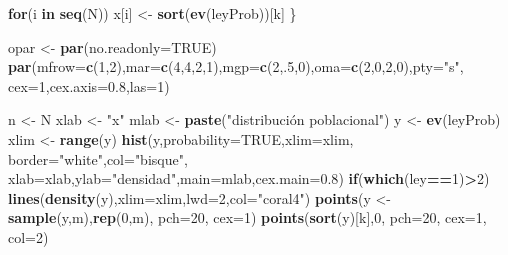 \documentclass[]{book}
\newenvironment{Shaded}{\begin{snugshade}}{\end{snugshade}}
\newcommand{\ControlFlowTok}[1]{\textcolor[rgb]{0.13,0.29,0.53}{\textbf{#1}}}
\newcommand{\DataTypeTok}[1]{\textcolor[rgb]{0.13,0.29,0.53}{#1}}
\newcommand{\DecValTok}[1]{\textcolor[rgb]{0.00,0.00,0.81}{#1}}
\newcommand{\FloatTok}[1]{\textcolor[rgb]{0.00,0.00,0.81}{#1}}
\newcommand{\KeywordTok}[1]{\textcolor[rgb]{0.13,0.29,0.53}{\textbf{#1}}}
\newcommand{\NormalTok}[1]{#1}
\newcommand{\OperatorTok}[1]{\textcolor[rgb]{0.81,0.36,0.00}{\textbf{#1}}}
\newcommand{\OtherTok}[1]{\textcolor[rgb]{0.56,0.35,0.01}{#1}}
\newcommand{\StringTok}[1]{\textcolor[rgb]{0.31,0.60,0.02}{#1}}
\begin{document}
\begin{Shaded}
\begin{Highlighting}[]
\ControlFlowTok{for}\NormalTok{(i }\ControlFlowTok{in} \KeywordTok{seq}\NormalTok{(N)) x[i] <-}\StringTok{ }\KeywordTok{sort}\NormalTok{(}\KeywordTok{ev}\NormalTok{(leyProb))[k]}
\NormalTok{\}}

\NormalTok{opar <-}\StringTok{ }\KeywordTok{par}\NormalTok{(}\DataTypeTok{no.readonly=}\OtherTok{TRUE}\NormalTok{)}
\KeywordTok{par}\NormalTok{(}\DataTypeTok{mfrow=}\KeywordTok{c}\NormalTok{(}\DecValTok{1}\NormalTok{,}\DecValTok{2}\NormalTok{),}\DataTypeTok{mar=}\KeywordTok{c}\NormalTok{(}\DecValTok{4}\NormalTok{,}\DecValTok{4}\NormalTok{,}\DecValTok{2}\NormalTok{,}\DecValTok{1}\NormalTok{),}\DataTypeTok{mgp=}\KeywordTok{c}\NormalTok{(}\DecValTok{2}\NormalTok{,.}\DecValTok{5}\NormalTok{,}\DecValTok{0}\NormalTok{),}\DataTypeTok{oma=}\KeywordTok{c}\NormalTok{(}\DecValTok{2}\NormalTok{,}\DecValTok{0}\NormalTok{,}\DecValTok{2}\NormalTok{,}\DecValTok{0}\NormalTok{),}\DataTypeTok{pty=}\StringTok{"s"}\NormalTok{,}
    \DataTypeTok{cex=}\DecValTok{1}\NormalTok{,}\DataTypeTok{cex.axis=}\FloatTok{0.8}\NormalTok{,}\DataTypeTok{las=}\DecValTok{1}\NormalTok{)}

\NormalTok{n <-}\StringTok{ }\NormalTok{N}
\NormalTok{xlab <-}\StringTok{ "x"}
\NormalTok{mlab <-}\StringTok{ }\KeywordTok{paste}\NormalTok{(}\StringTok{"distribución poblacional"}\NormalTok{)}
\NormalTok{y <-}\StringTok{ }\KeywordTok{ev}\NormalTok{(leyProb)}
\NormalTok{xlim <-}\StringTok{ }\KeywordTok{range}\NormalTok{(y)}
\KeywordTok{hist}\NormalTok{(y,}\DataTypeTok{probability=}\OtherTok{TRUE}\NormalTok{,}\DataTypeTok{xlim=}\NormalTok{xlim,}
    \DataTypeTok{border=}\StringTok{"white"}\NormalTok{,}\DataTypeTok{col=}\StringTok{"bisque"}\NormalTok{,}
    \DataTypeTok{xlab=}\NormalTok{xlab,}\DataTypeTok{ylab=}\StringTok{"densidad"}\NormalTok{,}\DataTypeTok{main=}\NormalTok{mlab,}\DataTypeTok{cex.main=}\FloatTok{0.8}\NormalTok{)}
\ControlFlowTok{if}\NormalTok{(}\KeywordTok{which}\NormalTok{(ley}\OperatorTok{==}\DecValTok{1}\NormalTok{)}\OperatorTok{>}\DecValTok{2}\NormalTok{) }\KeywordTok{lines}\NormalTok{(}\KeywordTok{density}\NormalTok{(y),}\DataTypeTok{xlim=}\NormalTok{xlim,}\DataTypeTok{lwd=}\DecValTok{2}\NormalTok{,}\DataTypeTok{col=}\StringTok{"coral4"}\NormalTok{)}
\KeywordTok{points}\NormalTok{(y <-}\StringTok{ }\KeywordTok{sample}\NormalTok{(y,m),}\KeywordTok{rep}\NormalTok{(}\DecValTok{0}\NormalTok{,m), }\DataTypeTok{pch=}\DecValTok{20}\NormalTok{, }\DataTypeTok{cex=}\DecValTok{1}\NormalTok{)}
\KeywordTok{points}\NormalTok{(}\KeywordTok{sort}\NormalTok{(y)[k],}\DecValTok{0}\NormalTok{, }\DataTypeTok{pch=}\DecValTok{20}\NormalTok{, }\DataTypeTok{cex=}\DecValTok{1}\NormalTok{, }\DataTypeTok{col=}\DecValTok{2}\NormalTok{)}


\end{Highlighting}
\end{Shaded}
\end{document}
